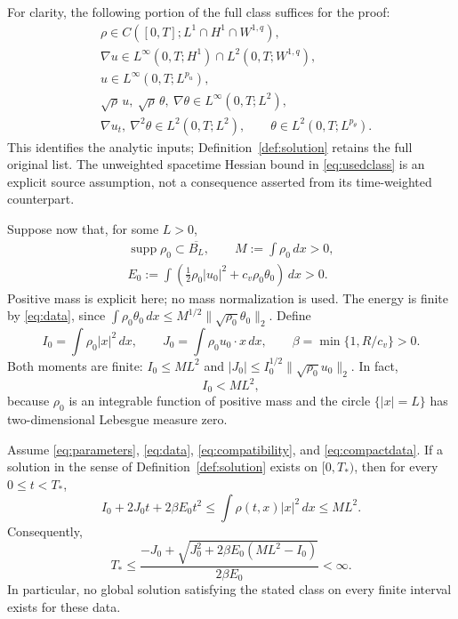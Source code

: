 \documentclass[10pt,twoside]{article}
\newcommand{\dd}{\,dx}
\newcommand{\supp}{\operatorname{supp}}
\newcommand{\norm}[2]{\lVert#1\rVert_{#2}}
\begin{document}
For clarity, the following portion of the full class suffices
for the proof:
\begin{equation}
 \begin{aligned}
 &\rho\in C([0,T];L^1\cap H^1\cap W^{1,q}),\\
 &\nabla u\in L^\infty(0,T;H^1)
                    \cap L^2(0,T;W^{1,q}),\\
 &u\in L^\infty(0,T;L^{p_u}),\\
 &\sqrt\rho\,u,\ \sqrt\rho\,\theta,\ \nabla\theta
                       \in L^\infty(0,T;L^2),\\
 &\nabla u_t,\ \nabla^2\theta\in L^2(0,T;L^2),\qquad
       \theta\in L^2(0,T;L^{p_\theta}).
 \end{aligned}\label{eq:usedclass}
\end{equation}
This identifies the analytic inputs; Definition~\ref{def:solution}
retains the full original list. The unweighted spacetime Hessian
bound in \eqref{eq:usedclass} is an explicit source assumption,
not a consequence asserted from its time-weighted counterpart.

Suppose now that, for some $L>0$,
\begin{equation}
 \begin{gathered}
 \supp\rho_0\subset\overline{B_L},\qquad M:=\int\rho_0\dd>0,\\
 E_0:=\int\left(\tfrac12\rho_0|u_0|^2+c_v\rho_0\theta_0\right)\dd>0.
 \end{gathered}
 \label{eq:compactdata}
\end{equation}
Positive mass is explicit here; no mass normalization is used.
The energy is finite by \eqref{eq:data}, since
$\int\rho_0\theta_0\dd
\le M^{1/2}\norm{\sqrt{\rho_0}\theta_0}{2}$.
Define
\begin{equation}
 I_0=\int\rho_0|x|^2\dd,\qquad
 J_0=\int\rho_0u_0\cdot x\dd,\qquad
 \beta=\min\{1,R/c_v\}>0.
 \label{eq:moments}
\end{equation}
Both moments are finite:
$I_0\le ML^2$ and
$|J_0|\le I_0^{1/2}\norm{\sqrt{\rho_0}u_0}{2}$. In fact,
\begin{equation}
 I_0<ML^2,
 \label{eq:strictmoment}
\end{equation}
because $\rho_0$ is an integrable function of positive mass and the
circle $\{|x|=L\}$ has two-dimensional Lebesgue measure zero.

\begin{theorem}\label{thm:obstruction}
Assume \eqref{eq:parameters}, \eqref{eq:data},
\eqref{eq:compatibility}, and \eqref{eq:compactdata}.
If a solution in the sense of Definition~\ref{def:solution} exists on
$[0,T_*)$, then for every $0\le t<T_*$,
\begin{equation}
 I_0+2J_0t+2\beta E_0t^2
       \le\int\rho(t,x)|x|^2\dd\le ML^2.
 \label{eq:mainbound}
\end{equation}
Consequently,
\begin{equation}
 T_*\le
 \frac{-J_0+\sqrt{J_0^2+2\beta E_0(ML^2-I_0)}}
      {2\beta E_0}<\infty.
 \label{eq:lifespan}
\end{equation}
In particular, no global solution satisfying the stated class on
every finite interval exists for these data.
\end{theorem}
\end{document}
